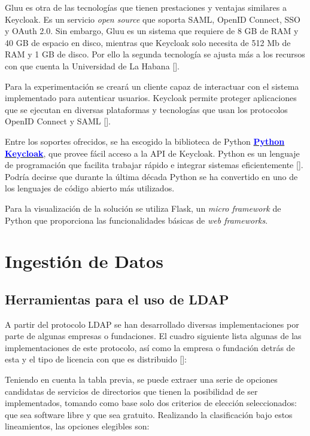 Gluu es otra de las tecnologías que tienen prestaciones y ventajas similares a Keycloak. Es un servicio \textit{open source} que soporta SAML, OpenID Connect, SSO y OAuth 2.0. Sin embargo, Gluu es un sistema que requiere de 8 GB de RAM y 40 GB de espacio en disco, mientras que Keycloak solo necesita de 512 Mb de RAM y 1 GB de disco. Por ello la segunda tecnología se ajusta más a los recursos con que cuenta  la Universidad de La Habana [\cite{vassallo2017continuous}].

Para la experimentación se creará un cliente capaz de interactuar con el sistema implementado para autenticar usuarios. Keycloak permite proteger aplicaciones que se ejecutan en diversas plataformas y tecnologías que usan los protocolos OpenID Connect y SAML [\cite{secure_apps_2022}]. 

Entre los soportes ofrecidos, se ha escogido la biblioteca de Python \href{https://pypi.org/project/python-keycloak/}{\textcolor{blue}{\textbf{Python Keycloak}}}, que provee fácil acceso a la API de Keycloak. Python es un lenguaje de programación que facilita trabajar rápido e integrar sistemas eficientemente [\cite{python_2022}]. Podría decirse que durante la última década Python se ha convertido en uno de los lenguajes de código abierto más utilizados.

Para la visualización de la solución se utiliza Flask, un \textit{micro framework} de Python que proporciona las funcionalidades básicas de\textit{ web frameworks}.

\section{Ingestión de Datos}

\subsection{Herramientas para el uso de LDAP}

A partir del protocolo LDAP se han desarrollado diversas implementaciones por parte de algunas empresas o fundaciones. El cuadro siguiente lista algunas de las implementaciones de este protocolo, así como la empresa o fundación detrás de esta y el tipo de licencia con que es distribuido [\cite{gonzalez2010implementacion}]:



Teniendo en cuenta la tabla previa, se puede extraer una serie de opciones candidatas de servicios de directorios que tienen la posibilidad de ser implementados, tomando como base solo dos criterios de elección seleccionados: que sea software libre y que sea gratuito. Realizando la clasificación bajo estos
lineamientos, las opciones elegibles son:

